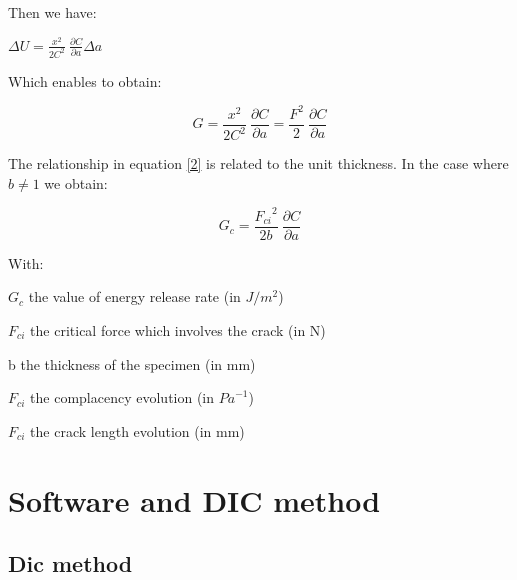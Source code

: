Then we have:

$\Delta U=\frac{x^2}{2C^2}\ \frac{\partial C}{\partial a}\Delta a$

Which enables to obtain:

\begin{equation}
	G=\frac{x^2}{2C^2}\ \frac{\partial C}{\partial a}=\frac{F^2}{2}\ \frac{\partial C}{\partial a}
	\label{2}
\end{equation}

The relationship in equation \ref{2} is related to the unit thickness. In the case where $b\neq1$
we obtain:

\begin{equation}
	G_c=\frac{{F_{ci}}^2}{2b}\ \frac{\partial C}{\partial a}
\end{equation}

With:

$G_c$ the value of energy release rate (in $J/m^2$)

$F_{ci}$ the critical force which involves the crack (in N)

b the thickness of the specimen (in mm)

$F_{ci}$ the complacency evolution (in ${Pa}^{-1}$)

$F_{ci}$ the crack length evolution (in mm)



\section{Software and DIC method}

\subsection{Dic method}

